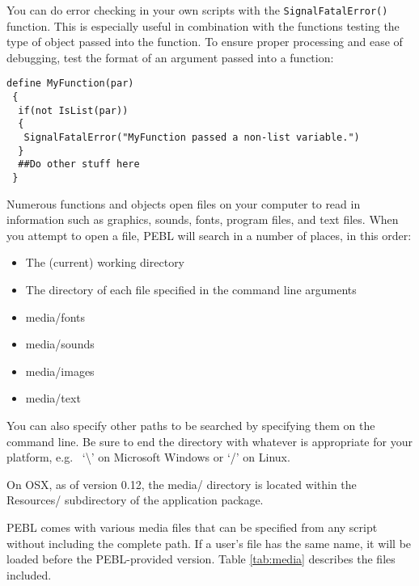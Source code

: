You can do error checking  in your own scripts with the
\texttt{SignalFatalError()} function.  This is especially useful in
combination with the functions testing the type of object passed into 
the function.  To ensure proper processing and ease of debugging, test
the format of an argument passed into a function:

\begin{verbatim}
define MyFunction(par)
 {
  if(not IsList(par))
  {
   SignalFatalError("MyFunction passed a non-list variable.")
  }
  ##Do other stuff here
 }
\end{verbatim}
 



Numerous functions and objects open files on your computer to read in
information such as graphics, sounds, fonts, program files, and text files.  When you attempt to open a file, PEBL will search in a number of places, 
in this order:
\begin{itemize}
\item
The (current) working directory
\item
The directory of each file specified in the command line arguments
\item
media/fonts
\item
media/sounds
\item
media/images
\item
media/text
\end{itemize}
  
You can also specify other paths to be searched by specifying them on the command line.  Be sure to end the directory with whatever is appropriate for your platform, e.g.~ `\textbackslash' on Microsoft Windows or `/' on Linux.

On OSX, as of version 0.12, the media/ directory is located within the Resources/ subdirectory of the application package.

\label{sec:media}

PEBL comes with various media files that can be specified from 
any script without including the complete path.  If a user's file has
the same name, it will be loaded before the PEBL-provided version.
Table \ref{tab:media} describes the files included.
\vspace{1cm}

